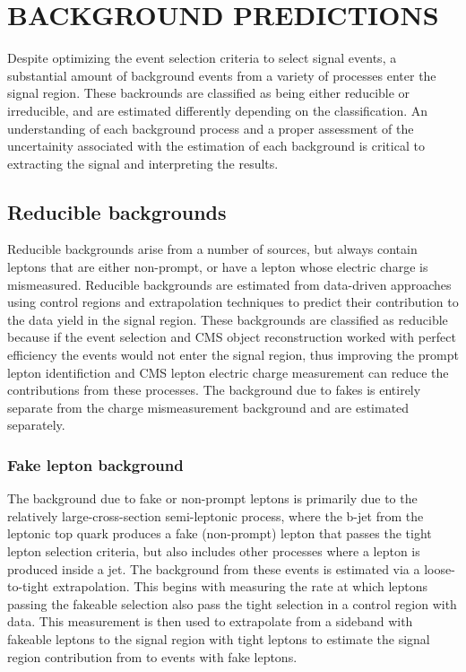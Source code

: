 %
%

\chapter{BACKGROUND PREDICTIONS}
Despite optimizing the event selection criteria to select signal events, a substantial amount of background events from a variety of processes enter the signal region.
These backrounds are classified as being either reducible or irreducible, and are estimated differently depending on the classification. An understanding
of each background process and a proper assessment of the uncertainity associated with the estimation of each background is critical to extracting the signal and interpreting
the results. 

\section{Reducible backgrounds}
Reducible backgrounds arise from a number of sources, but always contain leptons that are either non-prompt, or have a lepton whose electric charge is mismeasured.
Reducible backgrounds are estimated from data-driven approaches using control regions and extrapolation techniques to predict their contribution to the data yield in the
signal region. 
These backgrounds are classified as reducible because if the event selection and CMS object reconstruction worked with perfect efficiency the events would not
enter the signal region, thus improving the prompt lepton identifiction and CMS lepton electric charge measurement can reduce the contributions from these processes.
The background due to fakes is entirely
separate from the charge mismeasurement background and are estimated separately. 

\subsection{Fake lepton background}    
The background due to fake or non-prompt leptons is primarily due to the relatively large-cross-section semi-leptonic \ttbar process, where the b-jet from the leptonic top quark
produces a fake (non-prompt) lepton that passes the tight lepton selection criteria, but also includes other processes where a lepton is produced inside a jet. The background from
these events is estimated via a loose-to-tight extrapolation. This begins with measuring the rate at which leptons passing the fakeable selection also pass the tight selection in a
control region with data. This measurement is then used to extrapolate from a sideband with fakeable leptons to the signal region with
tight leptons to estimate the signal region contribution from to events with fake leptons. 

